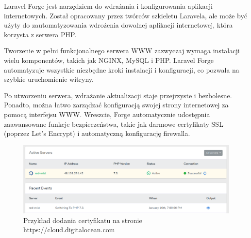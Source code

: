 Laravel Forge jest narzędziem do wdrażania i konfigurowania aplikacji internetowych. Został opracowany przez twórców szkieletu Laravela, ale może być użyty do zautomatyzowania wdrożenia dowolnej aplikacji internetowej, która korzysta z serwera PHP.

Tworzenie w pełni funkcjonalnego serwera WWW zazwyczaj wymaga instalacji wielu komponentów, takich jak NGINX, MySQL i PHP. Laravel Forge automatyzuje wszystkie niezbędne kroki instalacji i konfiguracji, co pozwala na szybkie uruchomienie witryny.

Po utworzeniu serwera, wdrażanie aktualizacji staje przejrzyste i bezbolesne. Ponadto, można łatwo zarządzać konfiguracją swojej strony internetowej za pomocą interfejsu WWW. Wreszcie, Forge automatycznie udostępnia zaawansowane funkcje bezpieczeństwa, takie jak darmowe certyfikaty SSL (poprzez Let's Encrypt) i automatyczną konfigurację firewalla.

\begin{figure}[!ht]
    \centering
    \includegraphics[width=6in]{images/forge.png}
    \caption{Przykład dodania certyfikatu na stronie https://cloud.digitalocean.com \label{fig:forge}}
\end{figure}